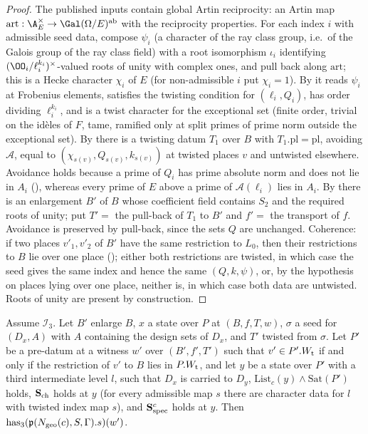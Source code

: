 \begin{proof}
The published inputs contain global Artin reciprocity: an Artin map
$\mathrm{art}:\A_E^\times\to\Gal(\Omega/E)^{\mathrm{ab}}$ with the reciprocity properties. For each index $i$
with admissible seed data, compose $\psi_i$ (a character of the ray class group, i.e.\ of the Galois group
of the ray class field) with a root isomorphism $\iota_i$ identifying $(\OO_i/\ell_i^{k_i})^\times$-valued
roots of unity with complex ones, and pull back along $\mathrm{art}$; this is a Hecke character $\chi_i$
of $E$ (for non-admissible $i$ put $\chi_i=1$). By
 it reads $\psi_i$ at Frobenius elements, satisfies
the twisting condition for $(\ell_i,Q_i)$, has order dividing $\ell_i^{k_i}$, and is a twist character for the
exceptional set (finite order, trivial on the id\`eles of $F$, tame, ramified only at split primes of prime
norm outside the exceptional set). By  there is a
twisting datum $T_1$ over $B$ with $T_1.\mathrm{pl}=\mathrm{pl}$, avoiding $\mathcal A$, equal to
$(\chi_{s(v)},Q_{s(v)},k_{s(v)})$ at twisted places $v$ and untwisted elsewhere. Avoidance holds because a
prime of $Q_i$ has prime absolute norm and does not lie in $A_i$
(), whereas every prime of $E$ above a prime of
$\mathcal A(\ell_i)$ lies in $A_i$. By  there is an enlargement $B'$ of $B$ whose
coefficient field contains $S_2$ and the required roots of unity; put $T'=$ the pull-back of $T_1$ to $B'$
and $f'=$ the transport of $f$. Avoidance is preserved by pull-back, since the sets $Q$ are unchanged. Coherence: if two places $v'_1,v'_2$ of $B'$ have the
same restriction to $L_0$, then their restrictions to $B$ lie over one place
(); either both restrictions are twisted, in which case
the seed gives the same index and hence the same $(Q,k,\psi)$, or, by the hypothesis on places lying over
one place,
neither is, in which case both data are untwisted. Roots of unity are present by construction.
\end{proof}

\begin{lemma}\label{pf:baselat2:carried}
Assume $\mathcal{I}_3$. Let $B'$ enlarge $B$, $x$ a state over $P$ at $(B,f,T,w)$, $\sigma$
a seed for $(D_x,A)$ with $A$ containing the design sets of $D_x$, and $T'$ twisted from $\sigma$. Let $P'$ be a
pre-datum at a witness $w'$ over $(B',f',T')$ such that $v'\in P'.W_{\mathrm{t}}$ if and only if the restriction of
$v'$ to $B$ lies in $P.W_{\mathrm{t}}$, and let $y$ be a state over $P'$ with a third intermediate level $l$, such
that $D_x$ is carried to $D_y$, $\mathrm{List}_c(y)\wedge\mathrm{Sat}(P')$ holds, $\mathbf{S}_{\mathrm{ch}}$ holds at
$y$ (for every admissible map $s$ there are character data for $l$ with twisted index map $s$), and
$\mathbf{S}_{\mathrm{spec}}^{c}$ holds at $y$. Then $\mathrm{has}_3(\mathfrak{p}(N_{\mathrm{geo}}(c),S,\Gamma).s)(w')$.
\end{lemma}

